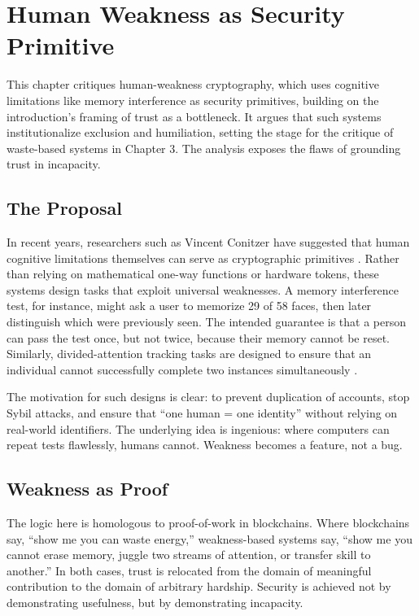\documentclass{book}
\begin{document}
\chapter{Human Weakness as Security Primitive}

This chapter critiques human-weakness cryptography, which uses cognitive limitations like memory interference as security primitives, building on the introduction’s framing of trust as a bottleneck. It argues that such systems institutionalize exclusion and humiliation, setting the stage for the critique of waste-based systems in Chapter 3. The analysis exposes the flaws of grounding trust in incapacity.

\section{The Proposal}

In recent years, researchers such as Vincent Conitzer have suggested that human cognitive limitations themselves can serve as cryptographic primitives \cite{conitzer2020}. Rather than relying on mathematical one-way functions or hardware tokens, these systems design tasks that exploit universal weaknesses. A memory interference test, for instance, might ask a user to memorize 29 of 58 faces, then later distinguish which were previously seen. The intended guarantee is that a person can pass the test once, but not twice, because their memory cannot be reset. Similarly, divided-attention tracking tasks are designed to ensure that an individual cannot successfully complete two instances simultaneously \cite{eriksen1985, mccormick1990, jans2010}.

The motivation for such designs is clear: to prevent duplication of accounts, stop Sybil attacks, and ensure that ``one human = one identity'' without relying on real-world identifiers. The underlying idea is ingenious: where computers can repeat tests flawlessly, humans cannot. Weakness becomes a feature, not a bug.

\section{Weakness as Proof}

The logic here is homologous to proof-of-work in blockchains. Where blockchains say, ``show me you can waste energy,'' weakness-based systems say, ``show me you cannot erase memory, juggle two streams of attention, or transfer skill to another.'' In both cases, trust is relocated from the domain of meaningful contribution to the domain of arbitrary hardship. Security is achieved not by demonstrating usefulness, but by demonstrating incapacity.
\end{document}
